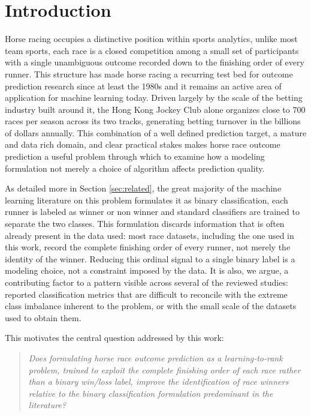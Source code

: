 \section{Introduction}
\label{sec:introduction}

Horse racing occupies a distinctive position within sports analytics, unlike most team sports, each race is a closed competition among a small set of participants with a single unambiguous outcome recorded down to the finishing order of every runner. This structure has made horse racing a recurring test bed for outcome prediction research since at least the 1980s \cite{article} and it remains an active area of application for machine learning today. Driven largely by the scale of the betting industry built around it, the Hong Kong Jockey Club alone organizes close to 700 races per season across its two tracks, generating betting turnover in the billions of dollars annually. This combination of a well defined prediction target, a mature and data rich domain, and clear practical stakes makes horse race outcome prediction a useful problem through which to examine how a modeling formulation not merely a choice of algorithm affects prediction quality.

As detailed more in Section \ref{sec:related}, the great majority of the machine learning literature on this problem formulates it as binary classification, each runner is labeled as winner or non winner and standard classifiers are trained to separate the two classes. This formulation discards information that is often already present in the data used: most race datasets, including the one used in this work, record the complete finishing order of every runner, not merely the identity of the winner. Reducing this ordinal signal to a single binary label is a modeling choice, not a constraint imposed by the data. It is also, we argue, a contributing factor to a pattern visible across several of the reviewed studies: reported classification metrics that are difficult to reconcile with the extreme class imbalance inherent to the problem, or with the small scale of the datasets used to obtain them.

This motivates the central question addressed by this work:

\begin{quote}
\textit{Does formulating horse race outcome prediction as a learning-to-rank
problem, trained to exploit the complete finishing order of each race rather
than a binary win/loss label, improve the identification of race winners relative
to the binary classification formulation predominant in the literature?}
\end{quote}

